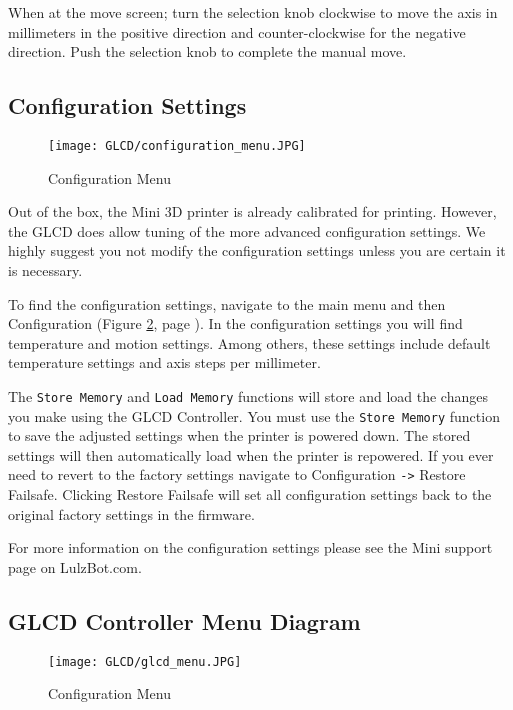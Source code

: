 When at the move screen; turn the selection knob clockwise to move the axis in millimeters in the positive direction and counter-clockwise for the negative direction. Push the selection knob to complete the manual move.

\subsection{Configuration Settings}

\begin{figure}[H]
\centering
\texttt{[image: GLCD/configuration\_menu.JPG]}
\caption{Configuration Menu}
\label{fig:configuration_menu}
\end{figure}

Out of the box, the Mini 3D printer is already calibrated for printing. However, the GLCD does allow tuning of the more advanced configuration settings. We highly suggest you not modify the configuration settings unless you are certain it is necessary.

To find the configuration settings, navigate to the main menu and then Configuration (Figure \ref{fig:configuration_menu}, page \pageref{fig:configuration_menu}). In the configuration settings you will find temperature and motion settings. Among others, these settings include default temperature settings and axis steps per millimeter.

The \texttt{Store Memory} and \texttt{Load Memory} functions will store and load the changes you make using the GLCD Controller. You must use the \texttt{Store Memory} function to save the adjusted settings when the printer is powered down. The stored settings will then automatically load when the printer is repowered. If you ever need to revert to the factory settings navigate to Configuration \texttt{->} Restore Failsafe. Clicking Restore Failsafe will set all configuration settings back to the original factory settings in the firmware.

For more information on the configuration settings please see the Mini support page on LulzBot.com.

\subsection{GLCD Controller Menu Diagram}
\begin{figure}[H]
\centering
\texttt{[image: GLCD/glcd\_menu.JPG]}
\caption{Configuration Menu}
\label{fig:configuration_menu}
\end{figure}




